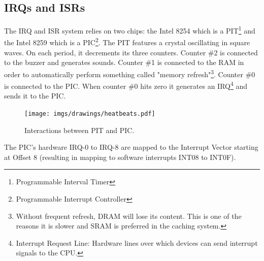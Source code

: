 \subsection{IRQs and ISRs}
The IRQ and ISR system relies on two chips: the Intel 8254 which is a PIT\footnote{Programmable Interval Timer} and the Intel 8259 which is a PIC\footnote{Programmable Interrupt Controller}. The PIT features a crystal oscillating in square waves. On each period, it decrements its three counters. Counter \#2 is connected to the buzzer and generates sounds. Counter \#1 is connected to the RAM in order to automatically perform something called "memory refresh"\footnote{Without frequent refresh, DRAM will lose its content. This is one of the reasons it is slower and SRAM is preferred in the caching system.}. Counter \#0 is connected to the PIC. When counter \#0 hits zero it generates an IRQ\footnote{Interrupt Request Line: Hardware lines over which devices can send interrupt signals to the CPU.} and sends it to the PIC.\\
\par
\begin{figure}[H]
  \centering
  \texttt{[image: imgs/drawings/heatbeats.pdf]}
  \caption{Interactions between PIT and PIC.}
\end{figure}
\par

The PIC's hardware IRQ-0 to IRQ-8 are mapped to the Interrupt Vector starting at Offset 8 (resulting in mapping to software interrupts INT08 to INT0F). \pagebreak

